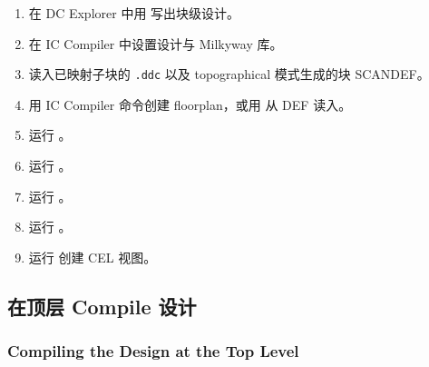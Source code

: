 \begin{enumerate}
  \item 在 DC Explorer 中用  写出块级设计。
  \item 在 IC Compiler 中设置设计与 Milkyway 库。
  \item 读入已映射子块的 \texttt{.ddc} 以及 topographical 模式生成的块 SCANDEF。
  \item 用 IC Compiler 命令创建 floorplan，或用  从 DEF 读入。
  \item 运行 。
  \item 运行 。
  \item 运行 。
  \item 运行 。
  \item 运行  创建 CEL 视图。
\end{enumerate}

\subsection{在顶层 Compile 设计}
\subsubsection*{Compiling the Design at the Top Level}

